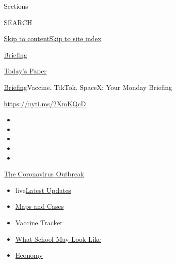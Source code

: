 Sections

SEARCH

\protect\hyperlink{site-content}{Skip to
content}\protect\hyperlink{site-index}{Skip to site index}

\href{https://www.nytimes.com/interactive/2018/briefing/global-morning-briefing-newsletter-signup.html}{Briefing}

\href{https://myaccount.nytimes.com/auth/login?response_type=cookie\&client_id=vi}{}

\href{https://www.nytimes.com/section/todayspaper}{Today's Paper}

\href{/interactive/2018/briefing/global-morning-briefing-newsletter-signup.html}{Briefing}\textbar{}Vaccine,
TikTok, SpaceX: Your Monday Briefing

\url{https://nyti.ms/2XmKQcD}

\begin{itemize}
\item
\item
\item
\item
\item
\end{itemize}

\href{https://www.nytimes.com/news-event/coronavirus?action=click\&pgtype=Article\&state=default\&region=TOP_BANNER\&context=storylines_menu}{The
Coronavirus Outbreak}

\begin{itemize}
\tightlist
\item
  live\href{https://www.nytimes.com/2020/08/02/world/coronavirus-updates.html?action=click\&pgtype=Article\&state=default\&region=TOP_BANNER\&context=storylines_menu}{Latest
  Updates}
\item
  \href{https://www.nytimes.com/interactive/2020/us/coronavirus-us-cases.html?action=click\&pgtype=Article\&state=default\&region=TOP_BANNER\&context=storylines_menu}{Maps
  and Cases}
\item
  \href{https://www.nytimes.com/interactive/2020/science/coronavirus-vaccine-tracker.html?action=click\&pgtype=Article\&state=default\&region=TOP_BANNER\&context=storylines_menu}{Vaccine
  Tracker}
\item
  \href{https://www.nytimes.com/interactive/2020/07/29/us/schools-reopening-coronavirus.html?action=click\&pgtype=Article\&state=default\&region=TOP_BANNER\&context=storylines_menu}{What
  School May Look Like}
\item
  \href{https://www.nytimes.com/live/2020/07/31/business/stock-market-today-coronavirus?action=click\&pgtype=Article\&state=default\&region=TOP_BANNER\&context=storylines_menu}{Economy}
\end{itemize}

